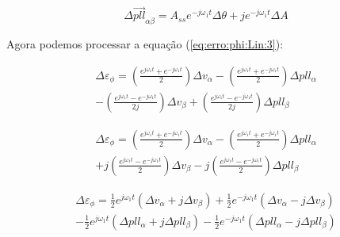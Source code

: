 \documentclass[12pt,a4paper]{report}
\begin{document}
\begin{equation}
\Delta \vec{pll}_{\alpha\beta} =
A_{ss} e^{-j\omega_1 t} \Delta \theta
+j e^{-j\omega_1 t} \Delta A
\end{equation}




Agora podemos processar a equação (\ref{eq:erro:phi:Lin:3}):

{
\color{blue}

\begin{multline}
\Delta \varepsilon_\phi = 
\left(
\frac{e^{j\omega_1 t} + e^{-j\omega_1 t}}{2}
\right)
\Delta v_{\alpha} 
- \left(
\frac{e^{j\omega_1 t} + e^{-j\omega_1 t}}{2}
\right)
\Delta pll_\alpha \\
- \left(
\frac{e^{j\omega_1 t} - e^{-j\omega_1 t}}{2j}
\right) 
\Delta v_\beta 
+ \left(
\frac{e^{j\omega_1 t} - e^{-j\omega_1 t}}{2j}
\right) 
\Delta pll_\beta
\end{multline}


\begin{multline}
\Delta \varepsilon_\phi = 
\left(
\frac{e^{j\omega_1 t} + e^{-j\omega_1 t}}{2}
\right)
\Delta v_{\alpha} 
- \left(
\frac{e^{j\omega_1 t} + e^{-j\omega_1 t}}{2}
\right)
\Delta pll_\alpha \\
+ j\left(
\frac{e^{j\omega_1 t} - e^{-j\omega_1 t}}{2}
\right) 
\Delta v_\beta 
- j\left(
\frac{e^{j\omega_1 t} - e^{-j\omega_1 t}}{2}
\right) 
\Delta pll_\beta
\end{multline}



\begin{multline}
\Delta \varepsilon_\phi =
\frac{1}{2} e^{j\omega_1 t}
( \Delta v_{\alpha}  + j\Delta v_{\beta} )
+\frac{1}{2} e^{-j\omega_1 t}
( \Delta v_{\alpha}  - j\Delta v_{\beta} )\\
-\frac{1}{2} e^{j\omega_1 t}
( \Delta pll_{\alpha}  + j\Delta pll_{\beta} )
-\frac{1}{2} e^{-j\omega_1 t}
( \Delta pll_{\alpha}  - j\Delta pll_{\beta} )
\end{multline}





}
\end{document}
